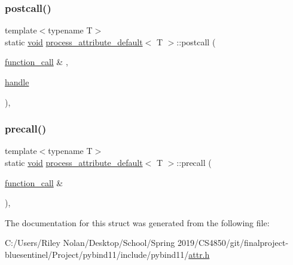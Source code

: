 \subsubsection{\texorpdfstring{postcall()}{postcall()}}
{\footnotesize\ttfamily template$<$typename T$>$ \\
static \mbox{\hyperlink{_s_d_l__opengles2__gl2ext_8h_ae5d8fa23ad07c48bb609509eae494c95}{void}} \mbox{\hyperlink{structprocess__attribute__default}{process\+\_\+attribute\+\_\+default}}$<$ T $>$\+::postcall (\begin{DoxyParamCaption}\item[{\mbox{\hyperlink{structfunction__call}{function\+\_\+call}} \&}]{,  }\item[{\mbox{\hyperlink{classhandle}{handle}}}]{ }\end{DoxyParamCaption})\hspace{0.3cm}{\ttfamily [inline]}, {\ttfamily [static]}}

\mbox{\label{structprocess__attribute__default_a703f4c14d30193e0747ed6f5208f1451}} 
\subsubsection{\texorpdfstring{precall()}{precall()}}
{\footnotesize\ttfamily template$<$typename T$>$ \\
static \mbox{\hyperlink{_s_d_l__opengles2__gl2ext_8h_ae5d8fa23ad07c48bb609509eae494c95}{void}} \mbox{\hyperlink{structprocess__attribute__default}{process\+\_\+attribute\+\_\+default}}$<$ T $>$\+::precall (\begin{DoxyParamCaption}\item[{\mbox{\hyperlink{structfunction__call}{function\+\_\+call}} \&}]{ }\end{DoxyParamCaption})\hspace{0.3cm}{\ttfamily [inline]}, {\ttfamily [static]}}



The documentation for this struct was generated from the following file\+:\begin{DoxyCompactItemize}
\item 
C\+:/\+Users/\+Riley Nolan/\+Desktop/\+School/\+Spring 2019/\+C\+S4850/git/finalproject-\/bluesentinel/\+Project/pybind11/include/pybind11/\mbox{\hyperlink{attr_8h}{attr.\+h}}\end{DoxyCompactItemize}
